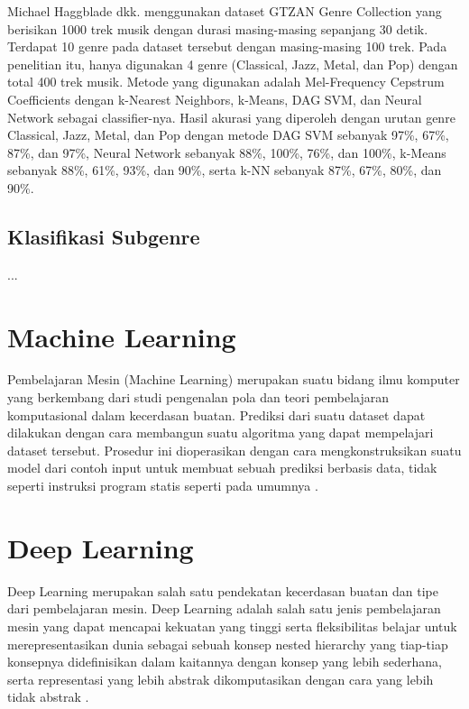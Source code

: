 Michael Haggblade dkk. \citep{Haggblade2011MusicGC} menggunakan dataset GTZAN Genre Collection yang berisikan 1000 trek musik dengan durasi masing-masing sepanjang 30 detik. Terdapat 10 genre pada dataset tersebut dengan masing-masing 100 trek. Pada penelitian itu, hanya digunakan 4 genre (Classical, Jazz, Metal, dan Pop) dengan total 400 trek musik. Metode yang digunakan adalah Mel-Frequency Cepstrum Coefficients dengan k-Nearest Neighbors, k-Means, DAG SVM, dan Neural Network sebagai classifier-nya. Hasil akurasi yang diperoleh dengan urutan genre Classical, Jazz, Metal, dan Pop dengan metode DAG SVM sebanyak 97\%, 67\%, 87\%, dan 97\%, Neural Network sebanyak 88\%, 100\%, 76\%, dan 100\%, k-Means sebanyak 88\%, 61\%, 93\%, dan 90\%, serta k-NN sebanyak 87\%, 67\%, 80\%, dan 90\%.

\subsection{Klasifikasi Subgenre}
...

\section{Machine Learning}
\label{sec:machinelearning}


Pembelajaran Mesin (Machine Learning) merupakan suatu bidang ilmu komputer yang berkembang dari studi pengenalan pola dan teori pembelajaran komputasional dalam kecerdasan buatan. Prediksi dari suatu dataset dapat dilakukan dengan cara membangun suatu algoritma yang dapat mempelajari dataset tersebut. Prosedur ini dioperasikan dengan cara mengkonstruksikan suatu model dari contoh input untuk membuat sebuah prediksi berbasis data, tidak seperti instruksi program statis seperti pada umumnya \citep{machineL}.

\section{Deep Learning}
\label{sec:deeplearning}
Deep Learning merupakan salah satu pendekatan kecerdasan buatan dan tipe dari pembelajaran mesin. Deep Learning adalah salah satu jenis pembelajaran mesin yang dapat mencapai kekuatan yang tinggi serta fleksibilitas belajar untuk merepresentasikan dunia sebagai sebuah konsep nested hierarchy yang tiap-tiap konsepnya didefinisikan dalam kaitannya dengan konsep yang lebih sederhana, serta representasi yang lebih abstrak dikomputasikan dengan cara yang lebih tidak abstrak \citep{deepL}.

